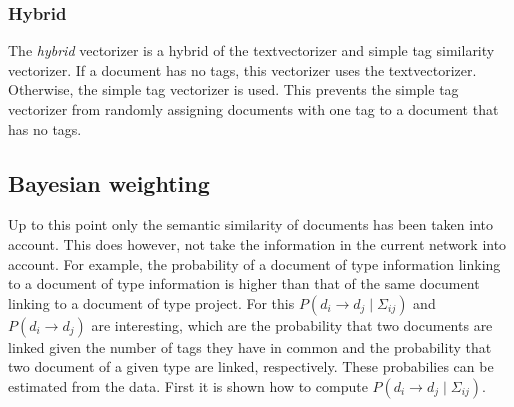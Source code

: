 \subsubsection{Hybrid}
The \emph{hybrid} vectorizer is a hybrid of the textvectorizer and simple tag
similarity vectorizer. If a document has no tags, this vectorizer uses the textvectorizer.
Otherwise, the simple tag vectorizer is used. This prevents the simple tag vectorizer
from randomly assigning documents with one tag to a document that has no tags. 


\subsection{Bayesian weighting}
Up to this point only the semantic similarity of documents has been taken into
account. This does however, not take the information in the current network
into account. For example, the probability of a document of type information
linking to a document of type information is higher than that of the same
document linking to a document of type project. For this $P(d_i \to d_j \mid
\Sigma_{ij})$ and $P(d_i \to d_j)$ are interesting, which are the
probability that two documents are linked given the number of tags they have in
common and the probability that two document of a given type are linked, respectively. These
probabilies can be estimated from the data. First it is shown how to compute
$P(d_i \to d_j \mid \Sigma_{ij})$.

